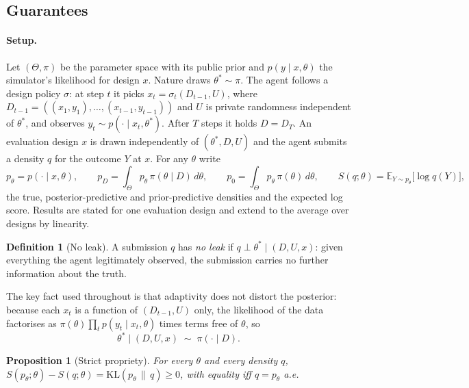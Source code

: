 \documentclass[10pt]{article}
\newtheorem{proposition}{Proposition}
\theoremstyle{definition}
\newtheorem{definition}{Definition}
\theoremstyle{remark}
\theoremstyle{plain}
\newcommand{\E}{\mathbb{E}}
\newcommand{\KL}{\mathrm{KL}}
\newcommand{\thetastar}{\theta^{*}}
\begin{document}
\subsection{Guarantees}
\label{sec:guarantees}

\paragraph{Setup.} Let $(\Theta,\pi)$ be the parameter space with its public prior and
$p(y\mid x,\theta)$ the simulator's likelihood for design $x$. Nature draws $\thetastar\sim\pi$. The
agent follows a design policy $\sigma$: at step $t$ it picks $x_t=\sigma_t(D_{t-1},U)$, where
$D_{t-1}=((x_1,y_1),\dots,(x_{t-1},y_{t-1}))$ and $U$ is private randomness independent of
$\thetastar$, and observes $y_t\sim p(\cdot\mid x_t,\thetastar)$. After $T$ steps it holds
$D=D_T$. An evaluation design $x$ is drawn independently of $(\thetastar,D,U)$ and the agent
submits a density $q$ for the outcome $Y$ at $x$. For any $\theta$ write
\[
p_\theta=p(\cdot\mid x,\theta),\qquad
p_D=\int_\Theta p_\theta\,\pi(\theta\mid D)\,d\theta,\qquad
p_0=\int_\Theta p_\theta\,\pi(\theta)\,d\theta,\qquad
S(q;\theta)=\E_{Y\sim p_\theta}\big[\log q(Y)\big],
\]
the true, posterior-predictive and prior-predictive densities and the expected log score. Results
are stated for one evaluation design and extend to the average over designs by linearity.

\begin{definition}[No leak]\label{def:noleak}
A submission $q$ has \emph{no leak} if $q\perp\thetastar\mid(D,U,x)$: given everything the agent
legitimately observed, the submission carries no further information about the truth.
\end{definition}

The key fact used throughout is that adaptivity does not distort the posterior: because each
$x_t$ is a function of $(D_{t-1},U)$ only, the likelihood of the data factorises as
$\pi(\theta)\prod_{t}p(y_t\mid x_t,\theta)$ times terms free of $\theta$, so
\begin{equation}
\thetastar \mid (D,U,x)\;\sim\;\pi(\cdot\mid D).
\label{eq:adaptive}
\end{equation}

\begin{proposition}[Strict propriety]\label{prop:proper}
For every $\theta$ and every density $q$,
$S(p_\theta;\theta)-S(q;\theta)=\KL(p_\theta\,\|\,q)\ge 0$, with equality iff $q=p_\theta$ a.e.
\end{proposition}
\end{document}
